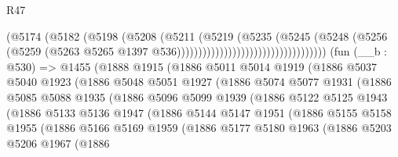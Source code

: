 \begin{lexlean}{R47}
\begin{coremodule}
                                                  (@5174
                                                    (@5182
                                                      (@5198
                                                        (@5208
                                                          (@5211
                                                            (@5219
                                                              (@5235
                                                                (@5245
                                                                  (@5248
                                                                    (@5256
                                                                      (@5259
                                                                        (@5263
                                                                          @5265
                                                                          @1397
                                                                          @536)))))))))))))))))))))))))))))))))))
    (fun (__b : @530) =>
    @1455
      (@1888
        @1915
        (@1886
          @5011
          @5014
          @1919
          (@1886
            @5037
            @5040
            @1923
            (@1886
              @5048
              @5051
              @1927
              (@1886
                @5074
                @5077
                @1931
                (@1886
                  @5085
                  @5088
                  @1935
                  (@1886
                    @5096
                    @5099
                    @1939
                    (@1886
                      @5122
                      @5125
                      @1943
                      (@1886
                        @5133
                        @5136
                        @1947
                        (@1886
                          @5144
                          @5147
                          @1951
                          (@1886
                            @5155
                            @5158
                            @1955
                            (@1886
                              @5166
                              @5169
                              @1959
                              (@1886
                                @5177
                                @5180
                                @1963
                                (@1886
                                  @5203
                                  @5206
                                  @1967
                                  (@1886

\end{coremodule}
\end{lexlean}
